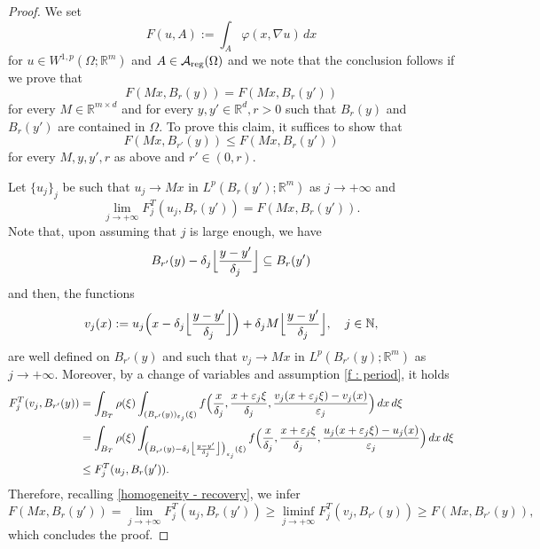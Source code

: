 \documentclass{article}
\theoremstyle{definition}
\newcommand{\f}{\varphi}
\newcommand{\ej}{\varepsilon_j}
\newcommand{\dej}{\delta_j}
\newcommand{\N}{\mathbb{N}}
\newcommand{\R}{\mathbb{R}}
\newcommand{\A}{\mathcal{A}}
\begin{document}
\begin{proof}
    We set 
    \begin{equation*}
        F(u,A):= \int_A \f(x, \nabla u)\, dx
    \end{equation*}
    for $u\in W^{1,p}(\Omega;\R^m)$ and $A\in\A_{\rm reg}(\Omega)$ and we note that the conclusion follows if we prove that 
    \begin{equation*}
        F(Mx, B_r(y))= F(Mx, B_r(y'))
    \end{equation*}
    for every $M\in \R^{m\times d}$ and for every $y,y'\in \R^d, r>0$ such that $B_r(y)$ and $B_r(y')$ are contained in $\Omega$. To prove this claim, it suffices to show that
\begin{equation*}
     F(Mx, B_{r'}(y)) \leq F(Mx, B_r(y'))
\end{equation*}
for every $M,y,y',r$ as above and $r'\in(0,r)$.

Let $\{u_j\}_j$ be such that $u_j\to Mx$ in $L^p(B_r(y'); \R^m)$ as $j\to+\infty$ and
\begin{equation}\label{homogeneity - recovery}
    \lim_{j\to+\infty} F^T_j(u_j, B_r(y')) = F(Mx, B_r(y')).  
\end{equation}
Note that, upon assuming that $j$ is large enough, we have
\begin{equation*}
    B_{r'}(y) -\dej\Bigl\lfloor \frac{y-y'}{\dej}\Bigr\rfloor \subseteq B_r(y')
\end{equation*}
and then, the functions
\begin{equation*}
    v_j(x):= u_j \Bigl(x-\dej\Bigl\lfloor \frac{y-y'}{\dej}\Bigr\rfloor\Bigr)+\dej M\Bigl\lfloor \frac{y-y'}{\dej}\Bigr\rfloor , \quad  j\in\N,
\end{equation*}
are well defined on $B_{r'}(y)$ and such that $v_j\to Mx$ in $L^p(B_{r'}(y); \R^m)$ as $j\to+\infty$. Moreover, by a change of variables and assumption \eqref{f : period}, it holds
\begin{align*}
     F^T_j(v_j, B_{r'}(y)) & = \int_{B_T} \rho(\xi)\int_{(B_{r'}(y))_{\ej}(\xi)} f\Bigl(\frac{x}{\dej},\frac{x+\ej\xi}{\dej},\frac{v_j(x+\ej\xi)-v_j(x)}{\ej}\Bigr)\, dx\,d\xi  \\
     & = \int_{B_T} \rho(\xi)\int_{\bigl(B_{r'}(y)-\dej\bigl\lfloor \frac{y-y'}{\dej}\bigr\rfloor\bigr)_{\ej}(\xi)} f\Bigl(\frac{x}{\dej},\frac{x+\ej\xi}{\dej},\frac{u_j(x+\ej\xi)-u_j(x)}{\ej}\Bigr)\, dx\,d\xi \\
     & \leq F^T_j(u_j, B_{r}(y')).
\end{align*}
Therefore, recalling \eqref{homogeneity - recovery}, we infer
\begin{equation*}
   F(Mx, B_r(y')) = \lim_{j\to+\infty} F^T_j(u_j, B_r(y')) \geq \liminf_{j\to+\infty}  F^T_j(v_j, B_{r'}(y)) \geq F(Mx, B_{r'}(y)),
\end{equation*}
which concludes the proof.
\end{proof}
\end{document}
